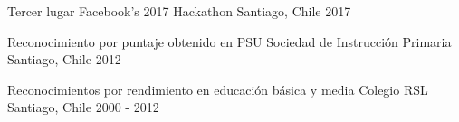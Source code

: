 
\begin{cvhonors}

  \cvhonor
    {Tercer lugar} %
    {Facebook's 2017 Hackathon} %
    {Santiago, Chile} %
    {2017} %

  \cvhonor
    {Reconocimiento por puntaje obtenido en PSU} %
    {Sociedad de Instrucción Primaria}
    {Santiago, Chile} %
    {2012} %

  \cvhonor
    {Reconocimientos por rendimiento en educación básica y media} %
    {Colegio RSL}
    {Santiago, Chile} %
    {2000 - 2012} %
\end{cvhonors}
